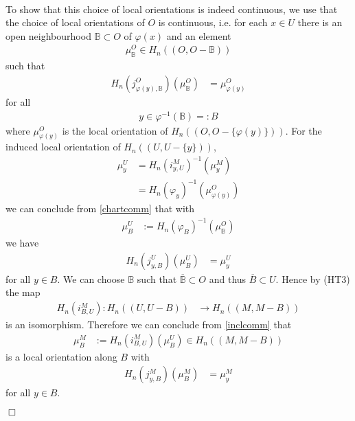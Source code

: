 \begin{prf}
\begin{enumerate}
\\
To show that this choice of local orientations is indeed continuous, we use that the choice of local orientations of $O$ is continuous, i.e. for each $x \in U$ there is an open neighbourhood $\mathbb{B} \subset O$ of $\varphi(x)$ and an element
\begin{align*}
  \mu_{\mathbb{B}}^{O}
  \in
  H_{n}((O,O - \mathbb{B}))
\end{align*}
such that
\begin{align*}
  H_{n}(j_{\varphi(y),\mathbb{B}}^{O})
  \left(
    \mu_{\mathbb{B}}^{O}
  \right)
  &=
  \mu_{\varphi(y)}^{O}
\end{align*}
for all
\begin{align*}
  y
  \in
  \varphi^{-1}(\mathbb{B})
  =:
  B
\end{align*}
where $\mu_{\varphi(y)}^{O}$ is the local orientation of $H_{n}((O,O - \lbrace \varphi(y) \rbrace))$. For the induced local orientation of $H_{n}((U,U - \lbrace y \rbrace))$,
\begin{align*}
  \mu_{y}^{U}
  &=
  H_{n}(i_{y,U}^{M})^{-1}
  \left(
    \mu_{y}^{M}
  \right)
  \\
  &=
  H_{n}(\varphi_{y})^{-1}
  \left(
    \mu_{\varphi(y)}^{O}
  \right)
\end{align*}
we can conclude from \eqref{chartcomm} that with
\begin{align*}
  \mu_{B}^{U}
  &:=
  H_{n}(\varphi_{B})^{-1}
  \left(
    \mu_{\mathbb{B}}^{O}
  \right)
\end{align*}
we have
\begin{align*}
  H_{n}(j_{y,B}^{U})(\mu_{B}^{U})
  &=
  \mu_{y}^{U}
\end{align*}
for all $y \in B$. We can choose $\mathbb{B}$ such that $\overline{\mathbb{B}} \subset O$ and thus $\overline{B} \subset U$. Hence by (HT3) the map
\begin{align*}
  H_{n}(i_{B,U}^{M})
  \colon
  H_{n}((U,U - B))
  &\to
  H_{n}((M,M - B))
\end{align*}
is an isomorphism. Therefore we can conclude from \eqref{inclcomm} that
\begin{align*}
  \mu_{B}^{M}
  &:=
  H_{n}(i_{B,U}^{M})(\mu_{B}^{U})
  \in
  H_{n}((M,M - B))
\end{align*}
is a local orientation along $B$ with
\begin{align*}
  H_{n}(j_{y,B}^{M})(\mu_{B}^{M})
  &=
  \mu_{y}^{M}
\end{align*}
for all $y \in B$.
\end{enumerate}
\phantom{proven}
\hfill
$\Box$
\end{prf}
